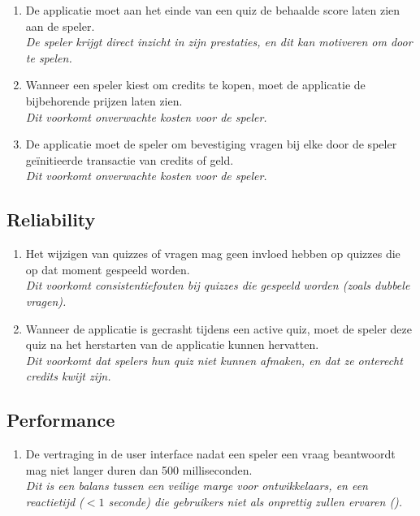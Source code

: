 \begin{enumerate}[label=\textbf{NFE\arabic*}.]
   \item De applicatie moet aan het einde van een quiz de behaalde score laten zien aan de speler.
         \\ \textit{De speler krijgt direct inzicht in zijn prestaties, en dit kan motiveren om door te spelen.}

   \item Wanneer een speler kiest om credits te kopen, moet de applicatie de bijbehorende prijzen laten zien.
         \\ \textit{Dit voorkomt onverwachte kosten voor de speler.}

   \item De applicatie moet de speler om bevestiging vragen bij elke door de speler ge\-ï\-ni\-ti\-eer\-de transactie van credits of geld.
         \\ \textit{Dit voorkomt onverwachte kosten voor de speler.}
\end{enumerate}

\subsection{Reliability}
\begin{enumerate}[resume*]
   \item Het wijzigen van quizzes of vragen mag geen invloed hebben op quizzes die op dat moment gespeeld worden.
         \\ \textit{Dit voorkomt consistentiefouten bij quizzes die gespeeld worden (zoals dubbele vragen).}

   \item Wanneer de applicatie is gecrasht tijdens een active quiz, moet de speler deze quiz na het herstarten van de applicatie kunnen hervatten.
         \\ \textit{Dit voorkomt dat spelers hun quiz niet kunnen afmaken, en dat ze onterecht credits kwijt zijn.}
\end{enumerate}

\subsection{Performance}
\begin{enumerate}[resume*]
   \item De vertraging in de user interface nadat een speler een vraag beantwoordt mag niet langer duren dan 500 milliseconden.
         \\ \textit{Dit is een balans tussen een veilige marge voor ontwikkelaars, en een reactietijd ($<1$ seconde) die gebruikers niet als onprettig zullen ervaren (\cite[134]{usability}).}
\end{enumerate}

